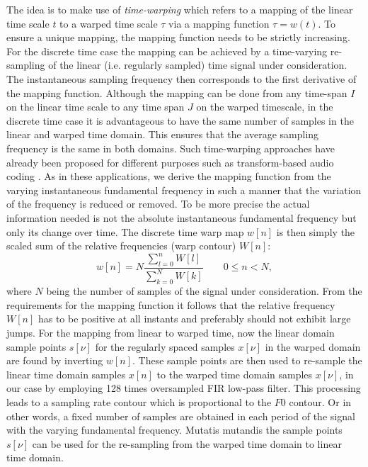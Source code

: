 The idea is to make use of \emph{time-warping} which refers to a mapping of the linear time scale $t$ to a warped time scale $\tau$ via a mapping function $\tau=w(t)$.
To ensure a unique mapping, the mapping function needs to be strictly increasing.
For the discrete time case the mapping can be achieved by a time-varying re-sampling of the linear (i.e. regularly sampled) time signal under consideration.
The instantaneous sampling frequency then corresponds to the first derivative of
the mapping function. Although the mapping can be done from any time-span
$I$ on the linear time scale to any time span $J$ on the warped timescale, in
the discrete time case it is advantageous to have the same number of samples
in the linear and warped time domain. This ensures that the average sampling
frequency is the same in both domains. Such time-warping approaches have already
been proposed for different purposes such as transform-based audio coding
\cite{edler09}. As in these applications, we derive the mapping function from
the varying instantaneous fundamental frequency in such a manner that the variation of the frequency is
reduced or removed. To be more precise the actual information needed is not
the absolute instantaneous fundamental frequency but only its change over time.
The discrete time warp map $w[n]$ is then simply the scaled sum of the relative
frequencies (warp contour) $W[n]$:
\begin{equation}\label{eq:time_warp}
w[n]=N \frac{\sum^n_{l=0}{W[l]}}{\sum^N_{k=0}{W[k]}}  \qquad 0\leq n<N,
\end{equation}
where $N$ being the number of samples of the signal under consideration.
From the requirements for the mapping function it follows that the relative
frequency $W[n]$ has to be positive at all instants and preferably should not
exhibit large jumps.
For the mapping from linear to warped time, now the linear domain sample points
$s[\nu]$ for the regularly spaced samples $x[\nu]$ in the warped domain are
found by inverting $w[n]$. These sample points are then used to re-sample the linear time
domain samples $x[n]$ to the warped time domain samples $x[\nu]$, in our case
by employing 128 times oversampled FIR low-pass filter. This processing leads to a sampling rate contour which is proportional to the $F0$ contour. Or in other words, a fixed number of samples are obtained in each period of the signal with the varying fundamental frequency. Mutatis mutandis the sample points $s[\nu]$ can be used for the re-sampling from the warped time domain to linear time domain. \\

